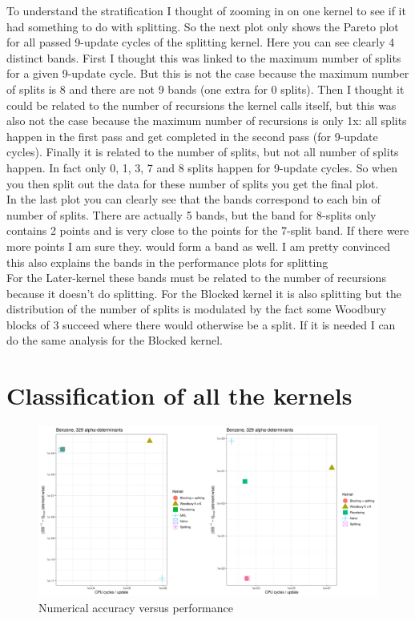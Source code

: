 \documentclass[11pt]{article}
\numberwithin{figure}{section}
\numberwithin{table}{section}
\begin{document}
        To understand the stratification I thought of zooming in on one kernel to see if it had something to do with splitting. So the next plot only shows the Pareto plot for all passed  9-update cycles of the splitting kernel. Here you can see clearly 4 distinct bands. First I thought this was linked to the maximum number of splits for a given 9-update cycle. But this is not the case because the maximum number of splits is 8 and there are not 9 bands (one extra for 0 splits). Then I thought it could be related to the number of recursions the kernel calls itself, but this was also not the case because the maximum number of recursions is only 1x: all splits happen in the first pass and get completed in the second pass (for 9-update cycles). Finally it is related to the number of splits, but not all number of splits happen. In fact only 0, 1, 3, 7 and 8 splits happen for 9-update cycles. So when you then split out the data for these number of splits you get the final plot.\\
        
        In the last plot you can clearly see that the bands correspond to each bin of number of splits. There are actually 5 bands, but the band for 8-splits only contains 2 points and is very close to the points for the 7-split band. If there were more points I am sure they. would form a band as well. I am pretty convinced this also explains the bands in the performance plots for splitting\\

        For the Later-kernel these bands must be related to the number of recursions because it doesn’t do splitting. For the Blocked kernel it is also splitting but the distribution of the number of splits is modulated by the fact some Woodbury blocks of 3 succeed where there would otherwise be a split. If it is needed I can do the same analysis for the Blocked kernel.

  \section{Classification of all the kernels}
  
    \begin{figure}[H]
      \centering
      \includegraphics[width=1\textwidth]{Pareto_passfail_mean.png}
      \caption{Numerical accuracy versus performance}
      \label{fig:Pareto_passfail_mean}
    \end{figure}
    
\end{document}
